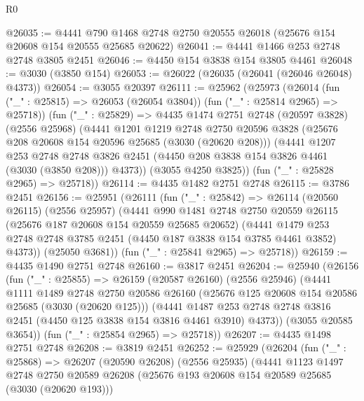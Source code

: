 \begin{lexlean}{R0}
\begin{coremodule}
@26035 := @4441 @790 @1468 @2748 @2750 @20555 @26018 (@25676 @154 @20608 @154 @20555 @25685 @20622)
@26041 := @4441 @1466 @253 @2748 @2748 @3805 @2451
@26046 := @4450 @154 @3838 @154 @3805 @4461
@26048 := @3030 (@3850 @154)
@26053 := @26022 (@26035 (@26041 (@26046 @26048) @4373))
@26054 := @3055 @20397
@26111 := @25962
    (@25973
      (@26014 (fun ("_" : @25815) => @26053 (@26054 @3804)) (fun ("_" : @25814 @2965) => @25718))
      (fun ("_" : @25829) =>
      @4435
        @1474
        @2751
        @2748
        (@20597 @3828)
        (@2556 @25968)
        (@4441
          @1201
          @1219
          @2748
          @2750
          @20596
          @3828
          (@25676 @208 @20608 @154 @20596 @25685 (@3030 (@20620 @208)))
          (@4441
            @1207
            @253
            @2748
            @2748
            @3826
            @2451
            (@4450 @208 @3838 @154 @3826 @4461 (@3030 (@3850 @208)))
            @4373))
        (@3055 @4250 @3825))
      (fun ("_" : @25828 @2965) => @25718))
@26114 := @4435 @1482 @2751 @2748
@26115 := @3786 @2451
@26156 := @25951
    (@26111
      (fun ("_" : @25842) =>
      @26114
        (@20560 @26115)
        (@2556 @25957)
        (@4441
          @990
          @1481
          @2748
          @2750
          @20559
          @26115
          (@25676 @187 @20608 @154 @20559 @25685 @20652)
          (@4441
            @1479
            @253
            @2748
            @2748
            @3785
            @2451
            (@4450 @187 @3838 @154 @3785 @4461 @3852)
            @4373))
        (@25050 @3681))
      (fun ("_" : @25841 @2965) => @25718))
@26159 := @4435 @1490 @2751 @2748
@26160 := @3817 @2451
@26204 := @25940
    (@26156
      (fun ("_" : @25855) =>
      @26159
        (@20587 @26160)
        (@2556 @25946)
        (@4441
          @1111
          @1489
          @2748
          @2750
          @20586
          @26160
          (@25676 @125 @20608 @154 @20586 @25685 (@3030 (@20620 @125)))
          (@4441
            @1487
            @253
            @2748
            @2748
            @3816
            @2451
            (@4450 @125 @3838 @154 @3816 @4461 @3910)
            @4373))
        (@3055 @20585 @3654))
      (fun ("_" : @25854 @2965) => @25718))
@26207 := @4435 @1498 @2751 @2748
@26208 := @3819 @2451
@26252 := @25929
    (@26204
      (fun ("_" : @25868) =>
      @26207
        (@20590 @26208)
        (@2556 @25935)
        (@4441
          @1123
          @1497
          @2748
          @2750
          @20589
          @26208
          (@25676 @193 @20608 @154 @20589 @25685 (@3030 (@20620 @193)))

\end{coremodule}
\end{lexlean}
